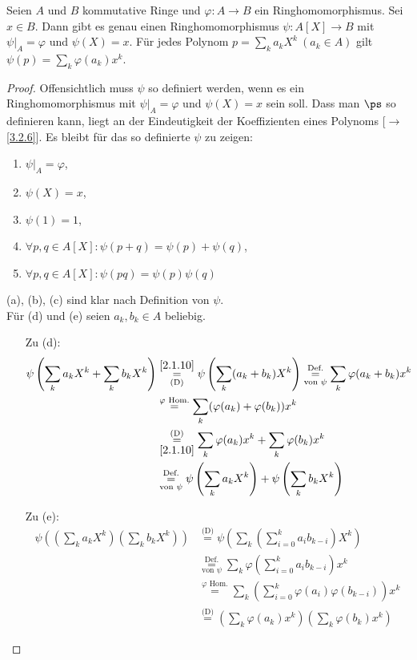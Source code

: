 \documentclass[../../main.tex]{subfiles}
\begin{document}
\begin{sat}\label{substitution}
Seien $A$ und $B$ kommutative Ringe und $\varphi:A\to B$ ein Ringhomomorphismus. Sei $x\in B$. Dann gibt es genau einen Ringhomomorphismus $\psi:A[X]\to B$ mit $\psi|_A=\varphi$ und $\psi(X)=x$. Für jedes Polynom $p=\sum_k a_kX^k ~(a_k\in A)$ gilt $\psi(p)=\sum_k\varphi(a_k)x^k$. 
\end{sat}
\begin{proof}
Offensichtlich muss $\psi$ so definiert werden, wenn es ein Ringhomomorphismus mit $\psi|_A=\varphi$ und $\psi(X)=x$ sein soll. Dass man $\ps$ so definieren kann, liegt an der Eindeutigkeit der Koeffizienten eines Polynoms
[$\to$ \ref{3.2.6}]. Es bleibt für das so definierte $\psi$ zu zeigen:
\begin{enumerate}[\normalfont(a)]
\item $\psi|_A=\varphi$,
\item $\psi(X)=x$,
\item $\psi(1)=1$,
\item $\forall p,q\in A[X]:\psi(p+q)=\psi(p)+\psi(q)$,
\item $\forall p,q\in A[X]:\psi(pq)=\psi(p)\psi(q)$
\end{enumerate}
(a), (b), (c) sind klar nach Definition von $\psi$.\\
Für (d) und (e) seien $a_k,b_k\in A$ beliebig. 
\begin{itemize}
\item[Zu (d):] 
\begin{align*}
\psi\left(\sum_k a_kX^k+\sum_kb_kX^k\right)&\overset{\ref{2.1.10}}{\underset{\text{(D)}}=}\psi\left(\sum_k(a_k+b_k)X^k\right)\overset{\text{Def.}}{\underset{\text{von $\psi$}}=}\sum_k\varphi(a_k+b_k)x^k\\
&\overset{\varphi\text{ Hom.}}=\sum_k(\varphi(a_k)+\varphi(b_k))x^k \\
&\overset{\text{(D)}}{\underset{\ref{2.1.10}}=}\sum_k\varphi(a_k)x^k+\sum_k\varphi(b_k)x^k\\
&\overset{\text{Def.}}{\underset{\text{von $\psi$}}=}\psi\left(\sum_ka_kX^k\right)+\psi\left(\sum_kb_kX^k\right)
\end{align*}
\item[Zu (e):] 
\begin{align*}
\psi\left(\left(\sum_k a_k X^k\right)\left(\sum_k b_k X^k\right)\right)&\overset{\text{(D)}}=\psi\left(\sum_k\left(\sum_{i=0}^ka_ib_{k-i}\right)X^k\right)\\
&\overset{\text{Def.}}{\underset{\text{von $\psi$}}=}\sum_k\varphi\left(\sum_{i=0}^ka_ib_{k-i}\right)x^k\\
&\overset{\varphi\text{ Hom.}}=\sum_k\left(\sum_{i=0}^k\varphi(a_i)\varphi(b_{k-i})\right)x^k\\
&\overset{\text{(D)}}=\left(\sum_k\varphi(a_k)x^k\right)\left(\sum_k\varphi(b_k)x^k\right)
\end{align*}
\end{itemize}
\end{proof}
\end{document}
